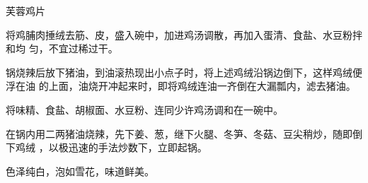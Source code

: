 \begin{recipe}{芙蓉鸡片}

\ingredients


\preparation

将鸡脯肉捶绒去筋、皮，盛入碗中，加进鸡汤调散，再加入蛋清、食盐、水豆粉拌和均
匀，不宜过稀过干。

锅烧辣后放下猪油，到油滚热现出小点子时，将上述鸡绒沿锅边倒下，这样鸡绒便浮在油
的上面，油烧开冲起来时，即将鸡绒连油一齐倒在大漏瓢内，滤去猪油。

将味精、食盐、胡椒面、水豆粉、连同少许鸡汤调和在一碗中。

在锅内用二两猪油烧辣，先下姜、葱，继下火腿、冬笋、冬菇、豆尖稍炒，随即倒下鸡绒
，以极迅速的手法炒数下，立即起锅。

\features

色泽纯白，泡如雪花，味道鲜美。

\end{recipe}

